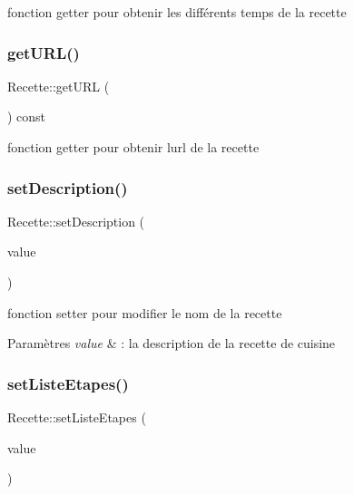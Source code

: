 fonction getter pour obtenir les différents temps de la recette 

\mbox{\label{classRecette_ab06006324a8201e9967b53273dbf2751}} 
\subsubsection{\texorpdfstring{get\+U\+R\+L()}{getURL()}}
{\footnotesize\ttfamily Recette\+::get\+U\+RL (\begin{DoxyParamCaption}{ }\end{DoxyParamCaption}) const}



fonction getter pour obtenir l\textquotesingle{}url de la recette 

\mbox{\label{classRecette_ad8e3af91743c2509d82983f5da803186}} 
\subsubsection{\texorpdfstring{set\+Description()}{setDescription()}}
{\footnotesize\ttfamily Recette\+::set\+Description (\begin{DoxyParamCaption}\item[{const Q\+String \&}]{value }\end{DoxyParamCaption})}



fonction setter pour modifier le nom de la recette 


\begin{DoxyParams}{Paramètres}
{\em value} & \+: la description de la recette de cuisine \\
\hline
\end{DoxyParams}
\mbox{\label{classRecette_aaf908c155a9b4936b94ca7852232f57d}} 
\subsubsection{\texorpdfstring{set\+Liste\+Etapes()}{setListeEtapes()}}
{\footnotesize\ttfamily Recette\+::set\+Liste\+Etapes (\begin{DoxyParamCaption}\item[{const Q\+String\+List \&}]{value }\end{DoxyParamCaption})}



